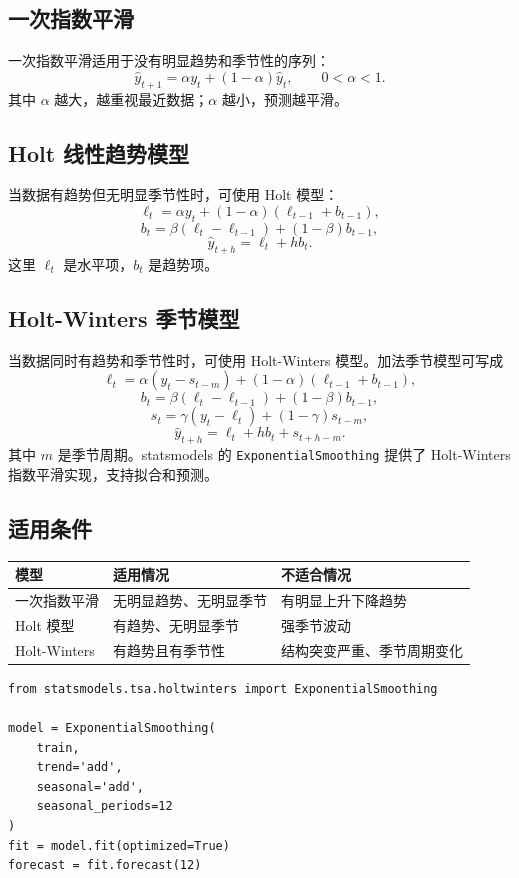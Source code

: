 \documentclass[11pt,a4paper]{ctexart}
\begin{document}
\subsection{一次指数平滑}
一次指数平滑适用于没有明显趋势和季节性的序列：
\[
\hat y_{t+1}=\alpha y_t+(1-\alpha)\hat y_t,
\qquad 0<\alpha<1.
\]
其中 $\alpha$ 越大，越重视最近数据；$\alpha$ 越小，预测越平滑。

\subsection{Holt 线性趋势模型}
当数据有趋势但无明显季节性时，可使用 Holt 模型：
\[
\ell_t=\alpha y_t+(1-\alpha)(\ell_{t-1}+b_{t-1}),
\]
\[
b_t=\beta(\ell_t-\ell_{t-1})+(1-\beta)b_{t-1},
\]
\[
\hat y_{t+h}=\ell_t+h b_t.
\]
这里 $\ell_t$ 是水平项，$b_t$ 是趋势项。

\subsection{Holt-Winters 季节模型}
当数据同时有趋势和季节性时，可使用 Holt-Winters 模型。加法季节模型可写成
\[
\ell_t=\alpha(y_t-s_{t-m})+(1-\alpha)(\ell_{t-1}+b_{t-1}),
\]
\[
b_t=\beta(\ell_t-\ell_{t-1})+(1-\beta)b_{t-1},
\]
\[
s_t=\gamma(y_t-\ell_t)+(1-\gamma)s_{t-m},
\]
\[
\hat y_{t+h}=\ell_t+h b_t+s_{t+h-m}.
\]
其中 $m$ 是季节周期。statsmodels 的 \texttt{ExponentialSmoothing} 提供了 Holt-Winters 指数平滑实现，支持拟合和预测。

\subsection{适用条件}
\begin{longtable}{p{3cm}p{5cm}p{5cm}}
\toprule
模型 & 适用情况 & 不适合情况 \\
\midrule
一次指数平滑 & 无明显趋势、无明显季节 & 有明显上升下降趋势 \\
Holt 模型 & 有趋势、无明显季节 & 强季节波动 \\
Holt-Winters & 有趋势且有季节性 & 结构突变严重、季节周期变化 \\
\bottomrule
\end{longtable}

\begin{lstlisting}
from statsmodels.tsa.holtwinters import ExponentialSmoothing

model = ExponentialSmoothing(
    train,
    trend='add',
    seasonal='add',
    seasonal_periods=12
)
fit = model.fit(optimized=True)
forecast = fit.forecast(12)
\end{lstlisting}
\end{document}
